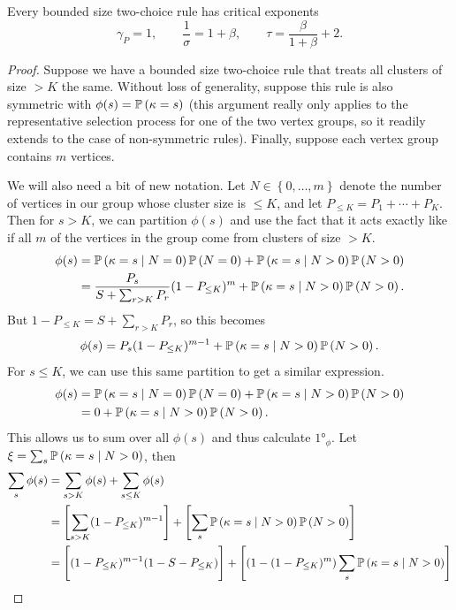 \documentclass[twoside,10pt]{article}
\begin{document}
\begin{thrm}[]
Every bounded size two-choice rule has critical exponents
\[
	\gamma_{P}=1, \qquad \frac{1}{\sigma} =1+\beta, \qquad \tau = \frac{\beta}{1+\beta} +2.
\]
\end{thrm}
\begin{proof}
	Suppose we have a bounded size two-choice rule that treats all clusters of size $>K$ the same. Without loss of generality, suppose this rule is also symmetric with $\phi(s) = \P{ \kappa=s }$ (this argument really only applies to the representative selection process for one of the two vertex groups, so it readily extends to the case of non-symmetric rules). Finally, suppose each vertex group contains $m$ vertices.

	We will also need a bit of new notation. Let $N \in \left\{ 0, \dots, m \right\}$ denote the number of vertices in our group whose cluster size is $\leq K$, and let $P_{\leq K} = P_1 + \cdots + P_{K}$. Then for $s>K$, we can partition $\phi(s)$ and use the fact that it acts exactly like \ER if all $m$ of the vertices in the group come from clusters of size $> K$.
	\begin{align*}
		\phi(s) &= \P{ \kappa = s \;|\; N = 0}\P{ N=0 } + \P{ \kappa = s \;|\; N>0 } \P{ N>0 } \\
			&= \frac{P_{s}}{S + \sum_{r>K}P_{r}} (1-P_{\leq K})^{m} + \P{ \kappa = s \;|\; N>0 } \P{ N>0 }.
	\end{align*}
	But $1-P_{\leq K} = S + \sum_{r>K}P_{r}$, so this becomes
	\[
		\phi(s) = P_{s}(1-P_{\leq K})^{m-1} + \P{ \kappa = s \;|\; N>0 } \P{ N>0 }.
	\]
	For $s \leq K$, we can use this same partition to get a similar expression.
	\begin{align*}
		\phi(s) &= \P{ \kappa = s \;|\; N = 0}\P{ N=0 } + \P{ \kappa = s \;|\; N>0 } \P{ N>0 } \\
			&= 0 + \P{ \kappa = s \;|\; N>0 } \P{ N>0 }.
	\end{align*}
	This allows us to sum over all $\phi(s)$ and thus calculate $\ang{1}_{\phi}$. Let $\xi = \sum_{s} \P{ \kappa=s\;|\; N>0 }$, then
	\begin{align*}
		\sum_{s} \phi(s) &= \sum_{s > K} \phi(s) + \sum_{ s \leq K}\phi(s) \\
				 &= \left[ \sum_{s>K}(1-P_{\leq K})^{m-1} \right] + \left[ \sum_{s} \P{ \kappa=s\;|\; N>0 }\P{ N>0 } \right] \\
				 &= \Bigg[ (1-P_{\leq K})^{m-1}(1-S-P_{\leq K}) \Bigg] + \left[ (1-(1-P_{\leq K})^{m}) \sum_{s} \P{ \kappa=s\;|\; N>0 } \right] \\

\end{align*}
\end{proof}
\end{document}
